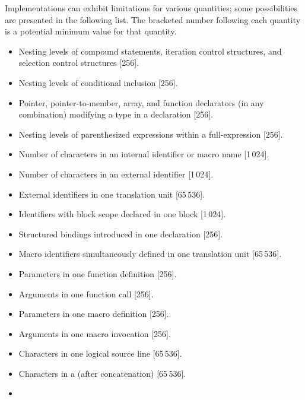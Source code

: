 
\pnum
Implementations can exhibit limitations for various quantities;
some possibilities are presented in the following list.
The bracketed number following each quantity is
a potential minimum value for that quantity.
\begin{itemize}
\item%
Nesting levels of compound statements,
iteration control structures,
and selection control structures [256].
\item%
Nesting levels of conditional inclusion [256].
\item%
Pointer,
pointer-to-member,
array, and
function
declarators (in any combination)
modifying a type in a declaration [256].
\item%
Nesting levels of parenthesized expressions within a full-expression [256].
\item%
Number of
characters in an internal identifier
or macro name [1\,024].
\item%
Number of
characters in an external identifier [1\,024].
\item%
External identifiers in one translation unit [65\,536].
\item%
Identifiers with block scope declared in one block [1\,024].
\item%
Structured bindings introduced in one declaration [256].
\item%
Macro identifiers simultaneously defined in one
translation
unit [65\,536].
\item%
Parameters in one function definition [256].
\item%
Arguments in one function call [256].
\item%
Parameters in one macro definition [256].
\item%
Arguments in one macro invocation [256].
\item%
Characters in one logical source line [65\,536].
\item%
Characters in a 
(after concatenation) [65\,536].
\item%

\end{itemize}
